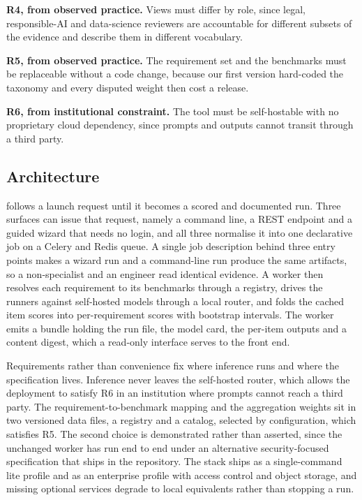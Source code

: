 \documentclass[10pt,conference]{IEEEtran}
\begin{document}
\textbf{R4, from observed practice.}
Views must differ by role, since legal, responsible-AI and data-science reviewers are accountable for different subsets of the evidence and describe them in different vocabulary.

\textbf{R5, from observed practice.}
The requirement set and the benchmarks must be replaceable without a code change, because our first version hard-coded the taxonomy and every disputed weight then cost a release.

\textbf{R6, from institutional constraint.}
The tool must be self-hostable with no proprietary cloud dependency, since prompts and outputs cannot transit through a third party.

\subsection{Architecture}
 follows a launch request until it becomes a scored and documented run.
Three surfaces can issue that request, namely a command line, a REST endpoint and a guided wizard that needs no login, and all three normalise it into one declarative job on a Celery and Redis queue.
A single job description behind three entry points makes a wizard run and a command-line run produce the same artifacts, so a non-specialist and an engineer read identical evidence.
A worker then resolves each requirement to its benchmarks through a registry, drives the runners against self-hosted models through a local router, and folds the cached item scores into per-requirement scores with bootstrap intervals.
The worker emits a bundle holding the run file, the model card, the per-item outputs and a content digest, which a read-only interface serves to the front end.

Requirements rather than convenience fix where inference runs and where the specification lives.
Inference never leaves the self-hosted router, which allows the deployment to satisfy R6 in an institution where prompts cannot reach a third party.
The requirement-to-benchmark mapping and the aggregation weights sit in two versioned data files, a registry and a catalog, selected by configuration, which satisfies R5.
The second choice is demonstrated rather than asserted, since the unchanged worker has run end to end under an alternative security-focused specification that ships in the repository.
The stack ships as a single-command lite profile and as an enterprise profile with access control and object storage, and missing optional services degrade to local equivalents rather than stopping a run.
\end{document}
